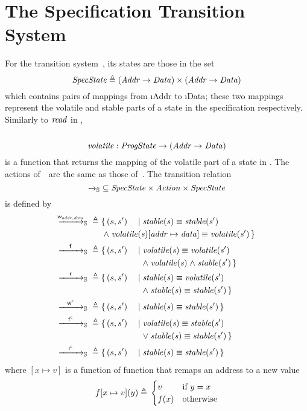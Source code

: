 \section{The Specification Transition System~\Spec}
\label{sec:Spec}

For the transition system~\Spec, its states are those in the set
$$ \mathit{SpecState} {}\triangleq{} (\mathit{Addr} \to \mathit{Data}) \times (\mathit{Addr} \to \mathit{Data}) $$
which contains pairs of mappings from \i{Addr} to \i{Data}; these two mappings represent the volatile and stable parts of a state in the specification respectively. Similarly to $\mathit{read}$ in \Prog, \\
\
$$ \mathit{volatile}: \mathit{ProgState} \to (\mathit{Addr} \to \mathit{Data}) $$
is a function that returns the mapping of the volatile part of a state in \Spec .
The actions of~\Spec\ are the same as those of~\Prog.
The transition relation
$$ {\xrightarrow{}_{\mathbb S}} \subseteq \mathit{SpecState} \times \mathit{Action} \times \mathit{SpecState} $$
is defined by
\begin{alignat*}{3}
	\ttS{\awa{ww}{\actw_{\i{addr}, \i{data}}}} \defeq{}& \{\, (s, s')&& \mid \i{stable(s)} \equiv \i{stable(s')} \\
	& \omit \span \span \conj \i{volatile(s)[addr \mapsto data]} \equiv \i{volatile(s')} \,\} \\
	\ttS{\awa{ww}\actf} \defeq{}& \{\, (s, s')&& \mid \i{volatile(s)} \equiv \i{volatile(s')}\\
	& \quad && \hmid \conj \i{volatile(s)} \conj \i{stable(s')} \,\} \\
	\ttS{\awa{ww}\actr} \defeq{}& \{\, (s, s')&& \mid \i{stable(s)} \equiv \i{volatile(s')}\\
	& \quad && \hmid \conj \i{stable(s)} \equiv \i{stable(s')} \,\} \\
	\ttS{\awa{ww}\actwc} \defeq{}& \{\, (s, s')&& \mid \i{stable(s)} \equiv \i{stable(s')} \,\} \\
	\ttS{\awa{ww}\actfc} \defeq{}& \{\, (s, s')&& \mid \i{volatile(s)} \equiv \i{stable(s')} \\
	& \quad && \hmid \disj \i{stable(s)} \equiv \i{stable(s')} \,\} \\
	\ttS{\awa{ww}\actrc} \defeq{}& \{\, (s, s')&& \mid \i{stable(s)} \equiv \i{stable(s')} \,\}
\end{alignat*}
where $[x \mapsto v]$ is a function of function that remaps an address to a new value
$$f[x \mapsto v](y) {}\triangleq{} \begin{cases} v & \text{if } y = x \\ f(x) & \text{otherwise} \end{cases} $$
